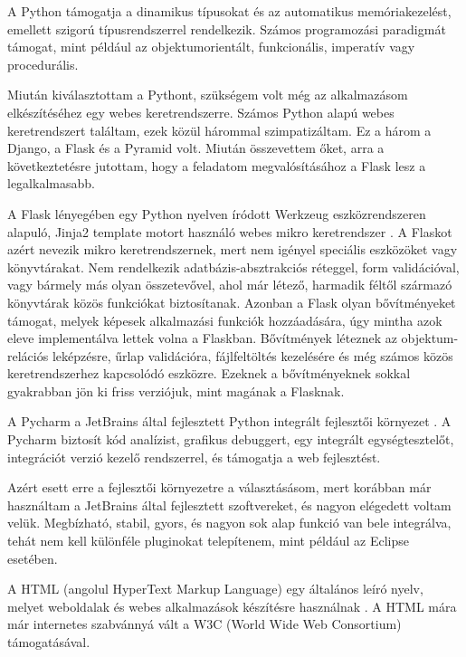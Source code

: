 A Python támogatja a dinamikus típusokat és az automatikus memóriakezelést, emellett szigorú típusrendszerrel rendelkezik. Számos programozási paradigmát támogat, mint például az objektumorientált, funkcionális, imperatív vagy procedurális.


Miután kiválasztottam a Pythont, szükségem volt még az alkalmazásom elkészítéséhez egy webes keretrendszerre. Számos Python alapú webes keretrendszert találtam, ezek közül hárommal szimpatizáltam. Ez a három a Django, a Flask és a Pyramid volt. Miután összevettem őket, arra a következtetésre jutottam, hogy a feladatom megvalósításához a Flask lesz a legalkalmasabb.

A Flask lényegében egy Python nyelven íródott Werkzeug eszközrendszeren alapuló, Jinja2 template motort használó webes mikro keretrendszer \cite{flask}. A Flaskot azért nevezik mikro keretrendszernek, mert nem igényel speciális eszközöket vagy könyvtárakat. Nem rendelkezik adatbázis-absztrakciós réteggel, form validációval, vagy bármely más olyan összetevővel, ahol már létező, harmadik féltől származó könyvtárak közös funkciókat biztosítanak. Azonban a Flask olyan bővítményeket támogat, melyek képesek alkalmazási funkciók hozzáadására, úgy mintha azok eleve implementálva lettek volna a Flaskban. Bővítmények léteznek az objektum-relációs leképzésre, űrlap validációra, fájlfeltöltés kezelésére és még számos közös keretrendszerhez kapcsolódó eszközre. Ezeknek a bővítményeknek sokkal gyakrabban jön ki friss verziójuk, mint magának a Flasknak.


A Pycharm a JetBrains által fejlesztett Python integrált fejlesztői környezet \cite{pycharm}. A Pycharm biztosít kód analízist, grafikus debuggert, egy integrált egységtesztelőt, integrációt verzió kezelő rendszerrel, és támogatja a web fejlesztést.

Azért esett erre a fejlesztői környezetre a választásásom, mert korábban már használtam a JetBrains által fejlesztett szoftvereket, és nagyon elégedett voltam velük. Megbízható, stabil, gyors, és nagyon sok alap funkció van bele integrálva, tehát nem kell különféle pluginokat telepítenem, mint például az Eclipse esetében.


A HTML (angolul HyperText Markup Language) egy általános leíró nyelv, melyet weboldalak és webes alkalmazások készítésre használnak \cite{html}. A HTML mára már internetes szabvánnyá vált a W3C (World Wide Web Consortium) támogatásával.

